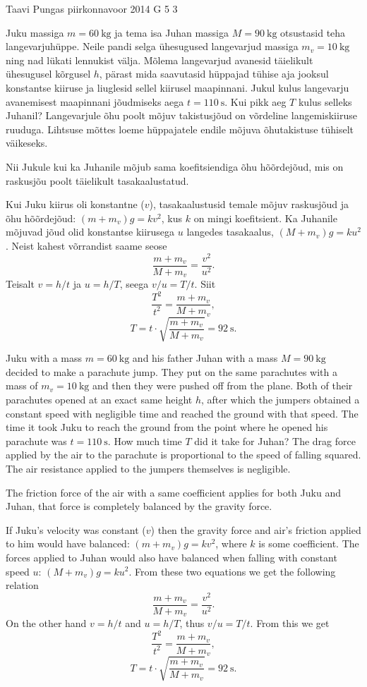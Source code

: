 {Taavi Pungas} %
{piirkonnavoor} %
{2014} %
{G 5} %
{3} %
{
\ifStatement
Juku massiga $m=\SI{60}{\kg}$ ja tema isa Juhan massiga $M=\SI{90}{\kg}$ otsustasid teha langevarjuhüppe. Neile pandi selga ühesugused langevarjud massiga $m_v=\SI{10}{\kg}$ ning nad lükati lennukist välja. Mõlema langevarjud avanesid täielikult ühesugusel kõrgusel $h$, pärast mida saavutasid hüppajad tühise aja jooksul konstantse kiiruse ja liuglesid sellel kiirusel maapinnani. Jukul kulus langevarju avanemisest maapinnani jõudmiseks aega $t=\SI{110}{\s}$. Kui pikk aeg $T$ kulus selleks Juhanil? Langevarjule õhu poolt mõjuv takistusjõud on võrdeline langemiskiiruse ruuduga. Lihtsuse mõttes loeme hüppajatele endile mõjuva õhutakistuse tühiselt väikeseks.
\fi


\ifHint
Nii Jukule kui ka Juhanile mõjub sama koefitsiendiga õhu hõõrdejõud, mis on raskusjõu poolt täielikult tasakaalustatud.
\fi


\ifSolution
Kui Juku kiirus oli konstantne ($v$), tasakaalustusid temale mõjuv raskusjõud ja õhu hõõrdejõud: $(m+m_v)g=kv^2$, kus $k$ on mingi koefitsient. Ka Juhanile mõjuvad jõud olid konstantse kiirusega $u$ langedes tasakaalus, $(M+m_v)g=ku^2$. Neist kahest võrrandist saame seose \[\frac{m+m_v}{M+m_v}=\frac{v^2}{u^2}.\] Teisalt $v=h/t$ ja $u=h/T$, seega $v/u=T/t$. Siit
\[\frac{T^2}{t^2}=\frac{m+m_v}{M+m_v},\]
\[T=t \cdot \sqrt{\frac{m+m_v}{M+m_v}}=\SI{92}{\s}.\]
\fi


\ifEngStatement
Juku with a mass $m=\SI{60}{\kg}$ and his father Juhan with a mass $M=\SI{90}{\kg}$ decided to make a parachute jump. They put on the same parachutes with a mass of $m_v=\SI{10}{\kg}$ and then they were pushed off from the plane. Both of their parachutes opened at an exact same height $h$, after which the jumpers obtained a constant speed with negligible time and reached the ground with that speed. The time it took Juku to reach the ground from the point where he opened his parachute was $t=\SI{110}{\s}$. How much time $T$ did it take for Juhan? The drag force applied by the air to the parachute is proportional to the speed of falling squared. The air resistance applied to the jumpers themselves is negligible.
\fi


\ifEngHint
The friction force of the air with a same coefficient applies for both Juku and Juhan, that force is completely balanced by the gravity force.
\fi


\ifEngSolution
If Juku’s velocity was constant ($v$) then the gravity force and air’s friction applied to him would have balanced: $(m+m_v)g=kv^2$, where $k$ is some coefficient. The forces applied to Juhan would also have balanced when falling with constant speed $u$: $(M+m_v)g=ku^2$. From these two equations we get the following relation
\[\frac{m+m_v}{M+m_v}=\frac{v^2}{u^2}.\]
On the other hand $v=h/t$ and $u=h/T$, thus $v/u=T/t$. From this we get
\[\frac{T^2}{t^2}=\frac{m+m_v}{M+m_v},\]
\[T=t \cdot \sqrt{\frac{m+m_v}{M+m_v}}=\SI{92}{\s}.\]
\fi
}